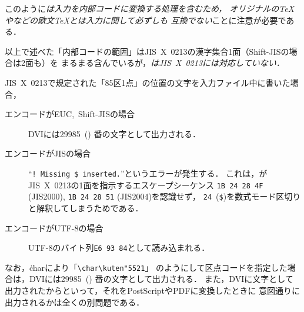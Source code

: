 \documentclass[a4paper,11pt,nomag,dvipdfmx]{jsarticle}
\begin{document}
このように\emph{\pTeX は入力を内部コードに変換する処理を含むため，
オリジナルの\TeX や\pdfTeX などの欧文\TeX とは入力に関して必ずしも
互換でない}ことに注意が必要である．

\begin{dangerous}
 以上で述べた「内部コードの範囲」はJIS~X~0213の漢字集合1面（Shift-JISの場合は2面も）を
 まるまる含んでいるが，\emph{\pTeX はJIS~X~0213には対応していない．}

 JIS~X~0213で規定された「85区1点」の位置の文字を入力ファイル中に書いた場合，
 \begin{description}
  \item[エンコードがEUC,~Shift-JISの場合] DVIには29985~()%
    番の文字として出力される．
  \item[エンコードがJISの場合] ``\verb|! Missing $ inserted.|''というエラーが発生する．
    これは，\pTeX がJIS~X~0213の1面を指示するエスケープシーケンス
    \texttt{1B 24 28 4F} (JIS2000), \texttt{1B 24 28 51} (JIS2004)を認識せず，
    \texttt{24}~(\texttt{\$})を数式モード区切りと解釈してしまうためである．
  \item[エンコードがUTF-8の場合] UTF-8のバイト列\texttt{E6 93 84}として読み込まれる．
 \end{description}
 なお，\.{char}により「\verb|\char\kuten"5521|」%
 のようにして区点コードを指定した場合は，DVIには29985~()%
 番の文字として出力される．
 また，DVIに文字として出力されたからといって，それをPostScriptやPDFに変換したときに
 意図通りに出力されるかは全くの別問題である．
\end{dangerous}
\end{document}
